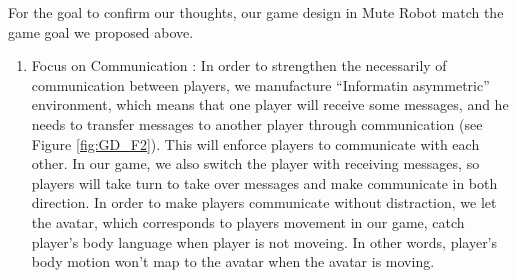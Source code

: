 \documentclass{sigchi}
\begin{document}
For the goal to confirm our thoughts, our game design in Mute Robot match the game goal we proposed above.
\begin{enumerate}
\item Focus on Communication : 
In order to strengthen the necessarily of communication between players, we manufacture ``Informatin asymmetric'' environment, which means that one player will receive some messages, and he needs to transfer messages to another player through communication (see Figure \ref{fig:GD_F2}). This will enforce players to communicate with each other. In our game, we also switch the player with receiving messages, so players will take turn to take over messages and make communicate in both direction. In order to make players communicate without distraction, we let the avatar, which corresponds to players movement in our game, catch player's body language when player is not moveing. In other words, player's body motion won't map to the avatar when the avatar is moving.


\end{enumerate}
\end{document}
